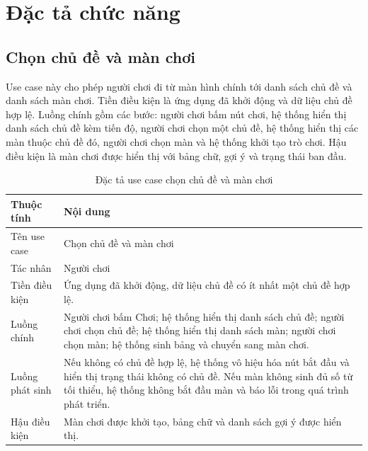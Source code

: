 \documentclass[../DoAn.tex]{subfiles}
\begin{document}

\section{Đặc tả chức năng}
\label{section:2.3}
\subsection{Chọn chủ đề và màn chơi}
Use case này cho phép người chơi đi từ màn hình chính tới danh sách chủ đề và danh sách màn chơi. Tiền điều kiện là ứng dụng đã khởi động và dữ liệu chủ đề hợp lệ. Luồng chính gồm các bước: người chơi bấm nút chơi, hệ thống hiển thị danh sách chủ đề kèm tiến độ, người chơi chọn một chủ đề, hệ thống hiển thị các màn thuộc chủ đề đó, người chơi chọn màn và hệ thống khởi tạo trò chơi. Hậu điều kiện là màn chơi được hiển thị với bảng chữ, gợi ý và trạng thái ban đầu.

\begin{table}[H]
\centering
\begin{tabularx}{\textwidth}{|>{\RaggedRight\arraybackslash}p{3.2cm}|>{\RaggedRight\arraybackslash}X|}
\hline
\textbf{Thuộc tính} & \textbf{Nội dung} \\ \hline
Tên use case & Chọn chủ đề và màn chơi \\ \hline
Tác nhân & Người chơi \\ \hline
Tiền điều kiện & Ứng dụng đã khởi động, dữ liệu chủ đề có ít nhất một chủ đề hợp lệ. \\ \hline
Luồng chính & Người chơi bấm Chơi; hệ thống hiển thị danh sách chủ đề; người chơi chọn chủ đề; hệ thống hiển thị danh sách màn; người chơi chọn màn; hệ thống sinh bảng và chuyển sang màn chơi. \\ \hline
Luồng phát sinh & Nếu không có chủ đề hợp lệ, hệ thống vô hiệu hóa nút bắt đầu và hiển thị trạng thái không có chủ đề. Nếu màn không sinh đủ số từ tối thiểu, hệ thống không bắt đầu màn và báo lỗi trong quá trình phát triển. \\ \hline
Hậu điều kiện & Màn chơi được khởi tạo, bảng chữ và danh sách gợi ý được hiển thị. \\ \hline
\end{tabularx}
\caption{Đặc tả use case chọn chủ đề và màn chơi}
\label{table:uc_select_stage}
\end{table}
\end{document}
